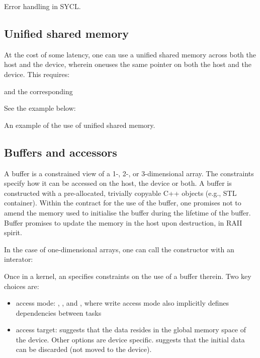 \raggedbottom
\begin{codebox}[]{\href{https://godbolt.org/z/h3aodW99P}{\ExternalLink}}
\footnotesize Error handling in SYCL.
\tcblower
{}
\end{codebox}
  
\subsection{Unified shared memory}
 
At the cost of some latency, one can use a unified shared memory across both the host and the device, wherein oneuses the same pointer on both the host and the device. This requires:
 

and the corresponding 


See the example below:
\raggedbottom
\begin{codebox}[]{\href{https://godbolt.org/z/hc1f9Pnj5}{\ExternalLink}}
\footnotesize An example of the use of unified shared memory.
\tcblower
{}
\end{codebox}
 
\subsection{Buffers and accessors}

A buffer is a constrained view of a 1-, 2-, or 3-dimensional array.
The constraints specify how it can be accessed on the host, the device or both. 
A buffer is constructed with a pre-allocated, trivially copyable C++ objects (e.g., STL container). 
Within the contract for the use of the buffer, 
one promises not to amend the memory used to initialise the buffer during the lifetime of the buffer. 
Buffer promises to update the memory in the host upon destruction, in RAII spirit. 

In the case of one-dimensional arrays, one can call the constructor with an interator:

Once in a kernel, an  specifies constraints on the use of a buffer therein. 
Two key choices are:
\begin{itemize}
\item access mode: , , and , where write access mode also implicitly defines dependencies between tasks
\item access target:  suggests that the data resides in the global memory space of the device. Other options are device specific.  suggests that the initial data can be discarded (not moved to the device). 
\end{itemize}

